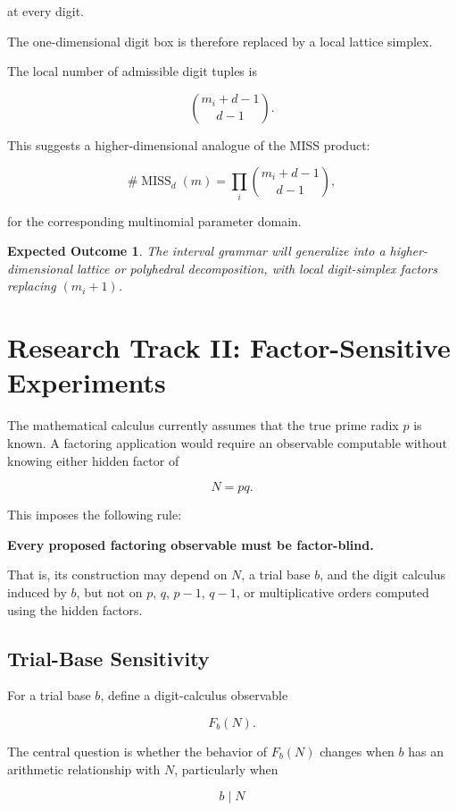 \documentclass[11pt]{article}
\newtheorem{expectation}{Expected Outcome}
\begin{document}
at every digit.

The one-dimensional digit box is therefore replaced by a local lattice simplex.

The local number of admissible digit tuples is

$$
\binom{m_i+d-1}{d-1}.
$$

This suggests a higher-dimensional analogue of the MISS product:

$$
\#\operatorname{MISS}_{d}(m)
=
\prod_i
\binom{m_i+d-1}{d-1},
$$

for the corresponding multinomial parameter domain.

\begin{expectation}
The interval grammar will generalize into a higher-dimensional lattice or polyhedral decomposition, with local digit-simplex factors replacing $(m_i+1)$.
\end{expectation}

\section{Research Track II: Factor-Sensitive Experiments}

The mathematical calculus currently assumes that the true prime radix $p$ is known. A factoring application would require an observable computable without knowing either hidden factor of

$$
N=pq.
$$

This imposes the following rule:

\begin{center}
\textbf{Every proposed factoring observable must be factor-blind.}
\end{center}

That is, its construction may depend on $N$, a trial base $b$, and the digit calculus induced by $b$, but not on $p$, $q$, $p-1$, $q-1$, or multiplicative orders computed using the hidden factors.

\subsection{Trial-Base Sensitivity}

For a trial base $b$, define a digit-calculus observable

$$
F_b(N).
$$

The central question is whether the behavior of $F_b(N)$ changes when $b$ has an arithmetic relationship with $N$, particularly when

$$
b\mid N
$$
\end{document}
